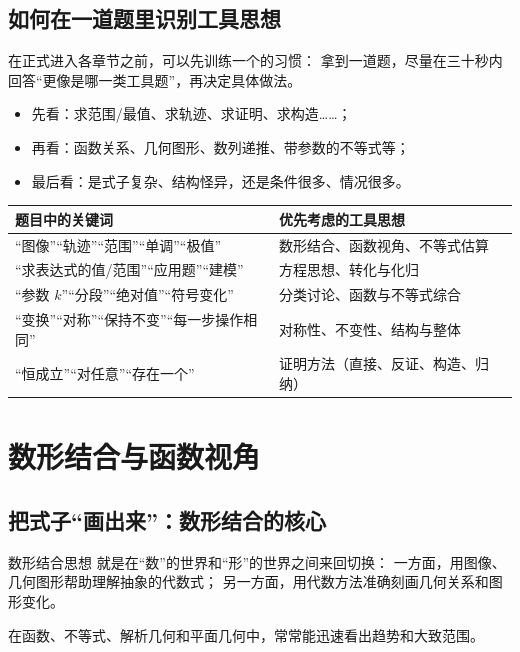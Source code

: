 \documentclass[a4paper,11pt]{ctexart}
\begin{document}
\subsection{如何在一道题里识别工具思想}

在正式进入各章节之前，可以先训练一个的习惯：
拿到一道题，尽量在三十秒内回答“更像是哪一类工具题”，再决定具体做法。

\begin{itemize}
  \item 先看：求范围/最值、求轨迹、求证明、求构造……；
  \item 再看：函数关系、几何图形、数列递推、带参数的不等式等；
  \item 最后看：是式子复杂、结构怪异，还是条件很多、情况很多。
\end{itemize}

\begin{center}

\vspace{0.5em}
\begin{tabular}{p{} p{}}
\hline
\textbf{题目中的关键词} & \textbf{优先考虑的工具思想} \\
\hline
“图像”“轨迹”“范围”“单调”“极值” & 数形结合、函数视角、不等式估算 \\
“求表达式的值/范围”“应用题”“建模” & 方程思想、转化与化归 \\
“参数 $k$”“分段”“绝对值”“符号变化” & 分类讨论、函数与不等式综合 \\
“变换”“对称”“保持不变”“每一步操作相同” & 对称性、不变性、结构与整体 \\
“恒成立”“对任意”“存在一个” & 证明方法（直接、反证、构造、归纳） \\
\hline
\end{tabular}
\end{center}

\section{数形结合与函数视角}

\subsection{把式子“画出来”：数形结合的核心}

\begin{definitionbox}{数形结合思想}
就是在“数”的世界和“形”的世界之间来回切换：
一方面，用图像、几何图形帮助理解抽象的代数式；
另一方面，用代数方法准确刻画几何关系和图形变化。
\par
在函数、不等式、解析几何和平面几何中，常常能迅速看出趋势和大致范围。
\end{definitionbox}
\end{document}
